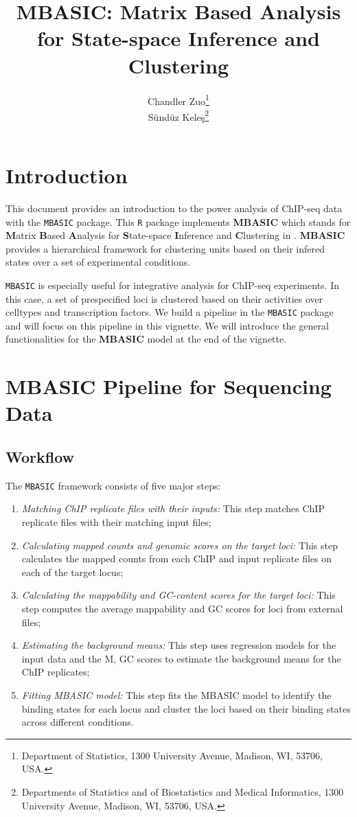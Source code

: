 \documentclass[a4paper,10pt]{article}
\title{MBASIC: Matrix Based Analysis for State-space Inference and Clustering}
\author{Chandler Zuo\footnote{Department of Statistics, 1300 University Avenue, Madison, WI, 53706, USA.}  \\ 
S\"und\"uz Kele\c{s}\footnote{Departments of Statistics and of  Biostatistics and Medical Informatics, 1300 University Avenue, Madison, WI, 53706, USA.}}
\date{}
\begin{document}
\maketitle

\tableofcontents

\section{Introduction}

This document provides an introduction to the power analysis of ChIP-seq data with
the \texttt{MBASIC} package. This \texttt{R} package implements \textbf{MBASIC} which stands for \textbf{M}atrix \textbf{B}ased \textbf{A}nalysis for \textbf{S}tate-space \textbf{I}nference and \textbf{C}lustering in \cite{zuo14}. \textbf{MBASIC} provides a hierarchical framework for clustering units based on their infered states over a set of experimental conditions.

\texttt{MBASIC} is especially useful for integrative analysis for ChIP-seq experiments. In this case, a set of prespecified loci is clustered based on their activities over celltypes and transcription factors. We build a pipeline in the \texttt{MBASIC} package and will focus on this pipeline in this vignette. We will introduce the general functionalities for the \textbf{MBASIC} model at the end of the vignette.

\section{MBASIC Pipeline for Sequencing Data}

\subsection{Workflow}

The \texttt{MBASIC} framework consists of five major steps:

\begin{enumerate}
  \item \textit{Matching ChIP replicate files with their inputs:} This step matches ChIP replicate files with their matching input files;
  \item \textit{Calculating mapped counts and genomic scores on the target loci:} This step calculates the mapped counts from each ChIP and input replicate files on each of the target locus;
  \item \textit{Calculating the mappability and GC-content scores for the target loci:} This step computes the average mappability and GC scores for loci from external files;
  \item \textit{Estimating the background means:} This step uses regression models for the input data and the M, GC scores to estimate the background means for the ChIP replicates;
  \item \textit{Fitting MBASIC model:} This step fits the MBASIC model to identify the binding states for each locus and cluster the loci based on their binding states across different conditions.
\end{enumerate}
\end{document}

